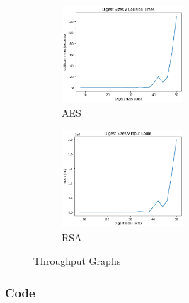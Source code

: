 \documentclass[11pt]{article}
\begin{document}
\begin{figure}[!ht]
	\centering
	\begin{subfigure}{1.00\textwidth}
		\centering
		\includegraphics[width=0.5\textwidth]{./assets/digest_sizes_v_collision_times.png}
		\caption{AES}
		\label{fig:collision_times}
	\end{subfigure}
	\begin{subfigure}{1.00\textwidth}
		\centering
		\includegraphics[width=0.5\textwidth]{./assets/digest_sizes_v_imput_count.png}
		\caption{RSA}
		\label{fig:collision_inputs}
	\end{subfigure}
	\caption{Throughput Graphs}
	\label{fig:vollision_performance} %
\end{figure}

\subsubsection*{Code}
\end{document}
